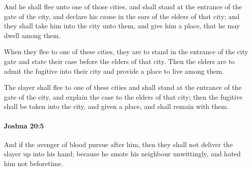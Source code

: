 			\begin{versebox}
					\item[BHS] 
					\item[ASV] And he shall flee unto one of those cities, and shall stand at the entrance of the gate of the city, and declare his cause in the ears of the elders of that city; and they shall take him into the city unto them, and give him a place, that he may dwell among them.
					\item[NIV] When they flee to one of these cities, they are to stand in the entrance of the city gate and state their case before the elders of that city. Then the elders are to admit the fugitive into their city and provide a place to live among them.
					\item[NRSV] The slayer shall flee to one of these cities and shall stand at the entrance of the gate of the city, and explain the case to the elders of that city; then the fugitive shall be taken into the city, and given a place, and shall remain with them.
			\end{versebox}

		\paragraph{Joshua 20:5} %
			\label{JOSHUA-20-5}

			And if the avenger of blood pursue after him, then they shall not deliver the slayer up into his hand; because he smote his neighbour unwittingly, and hated him not beforetime.

